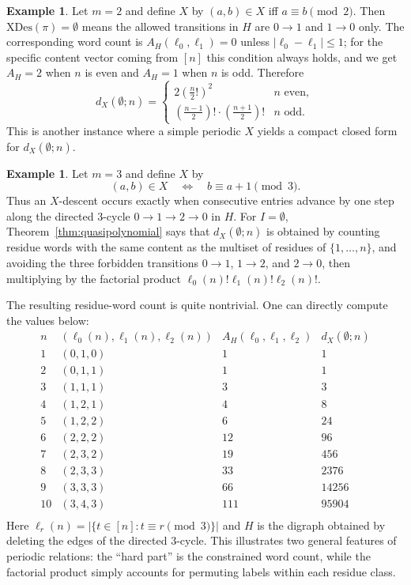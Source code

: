 \documentclass[12pt]{amsart}
\theoremstyle{definition}
\newtheorem{example}[theorem]{Example}
\theoremstyle{remark}
\newcommand{\XD}{\mathrm{XDes}}
\newcommand{\abs}[1]{\left|#1\right|}
\begin{document}
\begin{example}\label{ex:alternating-parity}
Let $m=2$ and define $X$ by $(a,b)\in X$ iff $a\equiv b\pmod 2$.
Then $\XD(\pi)=\emptyset$ means the allowed transitions in $H$ are $0\to 1$ and $1\to 0$ only. The corresponding word count is
$A_H(\ell_0,\ell_1)=0$ unless $|\ell_0-\ell_1|\le 1$; for the specific content vector coming from $[n]$ this condition
always holds, and we get $A_H=2$ when $n$ is even and $A_H=1$ when $n$ is odd.
Therefore
\[
d_X(\emptyset;n)=
\begin{cases}
2\left(\frac{n}{2}!\right)^2 & n \text{ even},\\[4pt]
\left(\frac{n-1}{2}\right)! \cdot \left(\frac{n+1}{2}\right)! & n \text{ odd}.
\end{cases}
\]
This is another instance where a simple periodic $X$ yields a compact closed form for $d_X(\emptyset;n)$.
\end{example}
\begin{example}Let $m=3$ and define $X$ by
\[
(a,b)\in X\quad\Longleftrightarrow\quad b\equiv a+1\pmod 3.
\]
Thus an $X$-descent occurs exactly when consecutive entries advance by one step along the directed $3$-cycle
$0\to 1\to 2\to 0$ in $H$.
For $I=\emptyset$, Theorem~\ref{thm:quasipolynomial} says that $d_X(\emptyset;n)$ is obtained by counting residue
words with the same content as the multiset of residues of $\{1,\dots,n\}$, and avoiding the three forbidden transitions
$0\to 1$, $1\to 2$, and $2\to 0$, then multiplying by the factorial product $\ell_0(n)!\ell_1(n)!\ell_2(n)!$.

The resulting residue-word count is quite nontrivial. One can directly compute the values below:
\[
\begin{array}{c|c|c|c}
n & (\ell_0(n),\ell_1(n),\ell_2(n)) & A_H(\ell_0,\ell_1,\ell_2) & d_X(\emptyset;n)\\ \hline
1 & (0,1,0) & 1 & 1 \\
2 & (0,1,1) & 1 & 1 \\
3 & (1,1,1) & 3 & 3 \\
4 & (1,2,1) & 4 & 8 \\
5 & (1,2,2) & 6 & 24 \\
6 & (2,2,2) & 12 & 96 \\
7 & (2,3,2) & 19 & 456 \\
8 & (2,3,3) & 33 & 2376 \\
9 & (3,3,3) & 66 & 14256 \\
10 & (3,4,3) & 111 & 95904 \\
\end{array}
\]
Here $\ell_r(n)=\abs{\{t\in[n]:t\equiv r\pmod 3\}}$ and $H$ is the digraph obtained by deleting the edges of the directed
$3$-cycle. This illustrates two general features of periodic relations: the ``hard part'' is the constrained word count, while the
factorial product simply accounts for permuting labels within each residue class.
\end{example}
\end{document}
